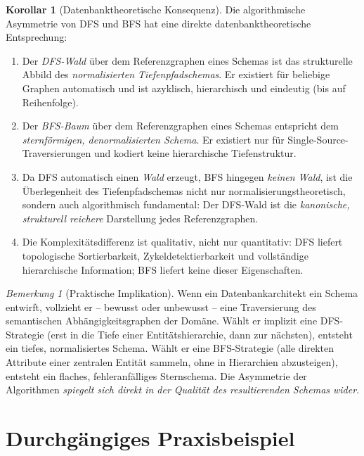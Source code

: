 ﻿\documentclass[12pt,a4paper]{article}
\theoremstyle{definition}
\newtheorem{corollary}[theorem]{Korollar}
\theoremstyle{remark}
\newtheorem{remark}{Bemerkung}[section]
\begin{document}
\begin{corollary}[Datenbanktheoretische Konsequenz]
\label{cor:konsequenz_asymmetrie}
Die algorithmische Asymmetrie von DFS und BFS hat eine direkte
datenbanktheoretische Entsprechung:

\begin{enumerate}[label=(\roman*)]
  \item Der \emph{DFS-Wald} über dem Referenzgraphen eines Schemas ist
        das strukturelle Abbild des \emph{normalisierten Tiefenpfadschemas}.
        Er existiert für beliebige Graphen automatisch und ist azyklisch,
        hierarchisch und eindeutig (bis auf Reihenfolge).
  \item Der \emph{BFS-Baum} über dem Referenzgraphen eines Schemas entspricht
        dem \emph{sternförmigen, denormalisierten Schema}. Er existiert nur
        für Single-Source-Traversierungen und kodiert keine hierarchische
        Tiefenstruktur.
  \item Da DFS automatisch einen \emph{Wald} erzeugt, BFS hingegen
        \emph{keinen Wald}, ist die Überlegenheit des Tiefenpfadschemas
        nicht nur normalisierungstheoretisch, sondern auch algorithmisch
        fundamental: Der DFS-Wald ist die \emph{kanonische, strukturell
        reichere} Darstellung jedes Referenzgraphen.
  \item Die Komplexitätsdifferenz ist qualitativ, nicht nur quantitativ:
        DFS liefert topologische Sortierbarkeit, Zykeldetektierbarkeit
        und vollständige hierarchische Information; BFS liefert keine
        dieser Eigenschaften.
\end{enumerate}
\end{corollary}

\begin{remark}[Praktische Implikation]
Wenn ein Datenbankarchitekt ein Schema entwirft, vollzieht er -- bewusst
oder unbewusst -- eine Traversierung des semantischen Abhängigkeitsgraphen
der Domäne. Wählt er implizit eine DFS-Strategie (erst in die Tiefe einer
Entitätshierarchie, dann zur nächsten), entsteht ein tiefes, normalisiertes
Schema. Wählt er eine BFS-Strategie (alle direkten Attribute einer zentralen
Entität sammeln, ohne in Hierarchien abzusteigen), entsteht ein flaches,
fehleranfälliges Sternschema. Die Asymmetrie der Algorithmen \emph{spiegelt
sich direkt in der Qualität des resultierenden Schemas wider}.
\end{remark}

\section{Durchgängiges Praxisbeispiel}
\label{sec:beispiel}
\end{document}
